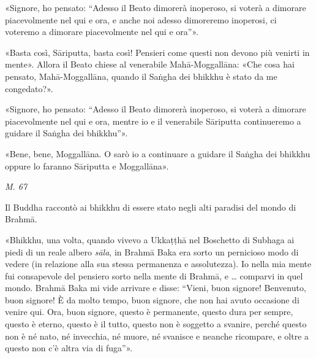 «Signore, ho pensato: “Adesso il Beato dimorerà inoperoso, si voterà a
dimorare piacevolmente nel qui e ora, e anche noi adesso dimoreremo
inoperosi, ci voteremo a dimorare piacevolmente nel qui e ora”».


«Basta così, Sāriputta, basta così! Pensieri come questi non devono più
venirti in mente». Allora il Beato chiese al venerabile Mahā-Moggallāna:
«Che cosa hai pensato, Mahā-Moggallāna, quando il Saṅgha dei bhikkhu è
stato da me congedato?».


«Signore, ho pensato: “Adesso il Beato dimorerà inoperoso, si voterà a
dimorare piacevolmente nel qui e ora, mentre io e il venerabile
Sāriputta continueremo a guidare il Saṅgha dei bhikkhu”».


«Bene, bene, Moggallāna. O sarò io a continuare a guidare il Saṅgha dei
bhikkhu oppure lo faranno Sāriputta e Moggallāna».


\emph{M. 67}


 Il Buddha raccontò ai bhikkhu di essere stato negli
alti paradisi del mondo di Brahmā.


 «Bhikkhu, una volta, quando vivevo a Ukkaṭṭhā nel Boschetto
di Subhaga ai piedi di un reale albero \emph{sāla}, in Brahmā Baka era sorto
un pernicioso modo di vedere (in relazione alla sua stessa permanenza e
assolutezza). Io nella mia mente fui consapevole del pensiero sorto
nella mente di Brahmā, e … comparvi in quel mondo. Brahmā Baka mi vide
arrivare e disse: “Vieni, buon signore! Benvenuto, buon signore! È da
molto tempo, buon signore, che non hai avuto occasione di venire qui.
Ora, buon signore, questo è permanente, questo dura per sempre, questo è
eterno, questo è il tutto, questo non è soggetto a svanire, perché
questo non è né nato, né invecchia, né muore, né svanisce e neanche
ricompare, e oltre a questo non c’è altra via di fuga”».


